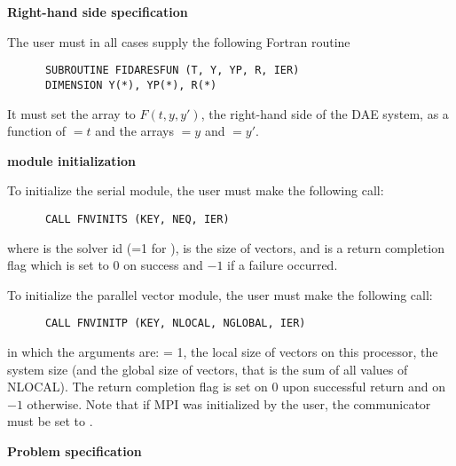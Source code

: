 \begin{Steps}
  
\item {\bf Right-hand side specification}
  
  The user must in all cases supply the following Fortran routine
\begin{verbatim}
      SUBROUTINE FIDARESFUN (T, Y, YP, R, IER)
      DIMENSION Y(*), YP(*), R(*)
\end{verbatim}
  It must set the  array to $F(t,y,y')$, the right-hand side of the DAE
  system, as a function of $=t$ and the arrays $=y$ and $=y'$.
  
\item  {\bf {\nvector} module initialization}

  {\s} To initialize the serial {\nvector} module, the user must make the
  following call:
\begin{verbatim}
      CALL FNVINITS (KEY, NEQ, IER)
\end{verbatim}
  where 
   is the solver id (=1 for {\ida}),
   is the size of vectors, and
   is a  return completion flag which is set to $0$ on success and $-1$ 
  if a failure occurred.
  
  {\p} To initialize the parallel vector module, the user must make the
  following call:
\begin{verbatim}
      CALL FNVINITP (KEY, NLOCAL, NGLOBAL, IER)
\end{verbatim}
  in which the arguments are:  = 1,  the local size of vectors on this
  processor,  the system size (and the global size of vectors, that
  is the sum of all values of NLOCAL). The return completion flag  is
  set on $0$ upon successful return and on $-1$ otherwise.
  Note that if MPI was initialized by the user, the communicator must be
  set to .
  
\item {\bf Problem specification}


\end{Steps}
